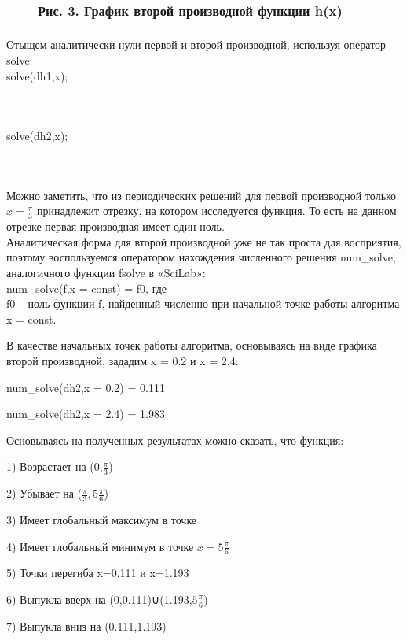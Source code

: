 ﻿ \documentclass[russian,utf8,nocolumnxxxi,nocolumnxxxii]{eskdtext}
\begin{document}
\begin{figure}[H]
\begin{center}
\begin{minipage}[h]{0.70\linewidth}
  \\
\frametitle{Рис. 3. График второй производной функции h(x)}
\frametitle{}
\end{minipage}
\end{center}
\end{figure}
Отыщем аналитически нули первой и второй производной, используя оператор solve:\\
solve(dh1,x);
\newpage
\begin{figure}[H]
\begin{center}
\begin{minipage}[h]{0.70\linewidth}
  \\
\frametitle{}
\frametitle{}
\end{minipage}
\end{center}
\end{figure}
solve(dh2,x);

\begin{figure}[H]
\begin{center}
\begin{minipage}[h]{0.70\linewidth}
  \\
\frametitle{}
\frametitle{}
\end{minipage}
\end{center}
\end{figure}

Можно заметить, что из периодических решений для первой производной только $x=\frac{\pi}{3}$ принадлежит отрезку, на котором исследуется функция. То есть на данном отрезке первая производная имеет один ноль.\\
Аналитическая форма для второй производной уже не так проста для восприятия, поэтому воспользуемся оператором нахождения численного решения num\_solve, аналогичного функции fsolve в «SciLab»:\\
num\_solve(f,x = const) = f0, где\\

f0 – ноль функции f, найденный численно при начальной точке работы алгоритма x = const.

В качестве начальных точек работы алгоритма, основываясь на виде графика второй производной, зададим x = 0.2 и x = 2.4:

num\_solve(dh2,x = 0.2) = 0.111

num\_solve(dh2,x = 2.4) = 1.983

Основываясь на полученных результатах можно сказать, что функция:

1) Возрастает на (0,$\frac{\pi}{3}$)

2) Убывает на ($\frac{\pi}{3},5\frac{\pi}{6}$)

3) Имеет глобальный максимум в точке

4) Имеет глобальный минимум в точке $x=5\frac{\pi}{6}$

5) Точки перегиба x=0.111 и x=1.193

6) Выпукла вверх на (0,0.111)∪(1.193,$5\frac{\pi}{6}$)

7) Выпукла вниз на (0.111,1.193)
\end{document}
